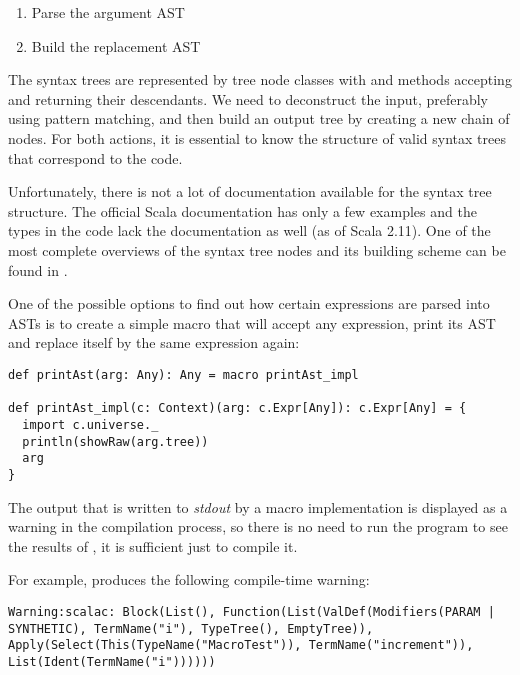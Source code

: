 \begin{enumerate}
	\item Parse the argument AST
	\item Build the replacement AST
\end{enumerate}

The syntax trees are represented by tree node classes with  and  methods accepting and returning their descendants. We need to deconstruct the input, preferably using pattern matching, and then build an output tree by creating a new chain of nodes. For both actions, it is essential to know the structure of valid syntax trees that correspond to the code.

Unfortunately, there is not a lot of documentation available for the syntax tree structure. The official Scala documentation has only a few examples and the types in the code lack the documentation as well (as of Scala 2.11). One of the most complete overviews of the syntax tree nodes and its building scheme can be found in \cite{noauthor_wolfe:_2017}.

One of the possible options to find out how certain expressions are parsed into ASTs is to create a simple macro that will accept any expression, print its AST and replace itself by the same expression again:

\lstset{style=Scala}
\begin{lstlisting}
def printAst(arg: Any): Any = macro printAst_impl

def printAst_impl(c: Context)(arg: c.Expr[Any]): c.Expr[Any] = {
  import c.universe._
  println(showRaw(arg.tree))
  arg
}
\end{lstlisting}

The output that is written to \textit{stdout} by a macro implementation is displayed as a warning in the compilation process, so there is no need to run the program to see the results of , it is sufficient just to compile it.

For example,  produces the following compile-time warning:

\lstset{style=Dump}
\begin{lstlisting}
Warning:scalac: Block(List(), Function(List(ValDef(Modifiers(PARAM | SYNTHETIC), TermName("i"), TypeTree(), EmptyTree)), Apply(Select(This(TypeName("MacroTest")), TermName("increment")), List(Ident(TermName("i"))))))
\end{lstlisting}


